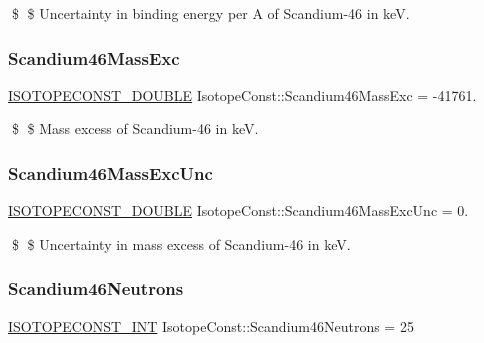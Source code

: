 \$ \$ Uncertainty in binding energy per A of Scandium-\/46 in keV. \mbox{\label{group___isotope_const-_scandium-_sc46_ga2ed2513a3a414a46d63bfef79d3691fa}} 
\subsubsection{\texorpdfstring{Scandium46\+Mass\+Exc}{Scandium46MassExc}}
{\footnotesize\ttfamily \mbox{\hyperlink{group___isotope_const-_macros_ga8f45a7272ce02c0b4c65c44636ed719a}{I\+S\+O\+T\+O\+P\+E\+C\+O\+N\+S\+T\+\_\+\+D\+O\+U\+B\+LE}} Isotope\+Const\+::\+Scandium46\+Mass\+Exc = -\/41761.}

\$ \$ Mass excess of Scandium-\/46 in keV. \mbox{\label{group___isotope_const-_scandium-_sc46_ga652901eb04b2e7c85ebbae5cb6789017}} 
\subsubsection{\texorpdfstring{Scandium46\+Mass\+Exc\+Unc}{Scandium46MassExcUnc}}
{\footnotesize\ttfamily \mbox{\hyperlink{group___isotope_const-_macros_ga8f45a7272ce02c0b4c65c44636ed719a}{I\+S\+O\+T\+O\+P\+E\+C\+O\+N\+S\+T\+\_\+\+D\+O\+U\+B\+LE}} Isotope\+Const\+::\+Scandium46\+Mass\+Exc\+Unc = 0.}

\$ \$ Uncertainty in mass excess of Scandium-\/46 in keV. \mbox{\label{group___isotope_const-_scandium-_sc46_ga735c5db2870398b9b21e16f43606045d}} 
\subsubsection{\texorpdfstring{Scandium46\+Neutrons}{Scandium46Neutrons}}
{\footnotesize\ttfamily \mbox{\hyperlink{group___isotope_const-_macros_ga5f18360b3e99483a35c32d789e62621c}{I\+S\+O\+T\+O\+P\+E\+C\+O\+N\+S\+T\+\_\+\+I\+NT}} Isotope\+Const\+::\+Scandium46\+Neutrons = 25}

